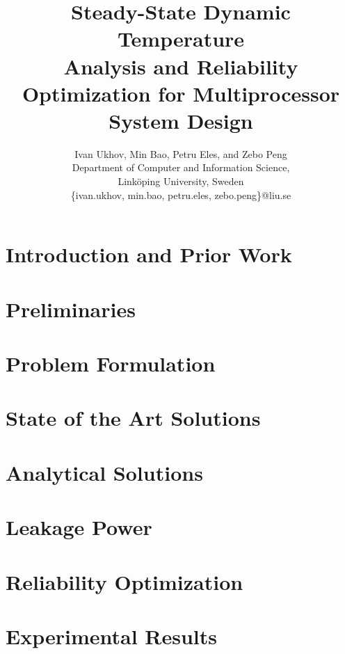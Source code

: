 \documentclass[conference]{IEEEtran}
\title{Steady-State Dynamic Temperature \\Analysis and Reliability Optimization for Multiprocessor System Design}
\author{
  Ivan Ukhov, Min Bao, Petru Eles, and Zebo Peng \\
  Department of Computer and Information Science,\\
  Link\"{o}ping University, Sweden \\
  \{ivan.ukhov, min.bao, petru.eles, zebo.peng\}@liu.se
}
\begin{document}
  \maketitle

  \begin{abstract}
    
  \end{abstract}

  \section{Introduction and Prior Work}
  

  \section{Preliminaries} \label{sec:preliminaries}
  

  \section{Problem Formulation} \label{sec:problem}
  

  \section{State of the Art Solutions} \label{sec:hotspot-solution}
  

  \section{Analytical Solutions} \label{sec:analytical-solution}
  

  \section{Leakage Power} \label{sec:leakage}
  

  \section{Reliability Optimization} \label{sec:reliability}
  

  \section{Experimental Results} \label{sec:results}
  
\end{document}
